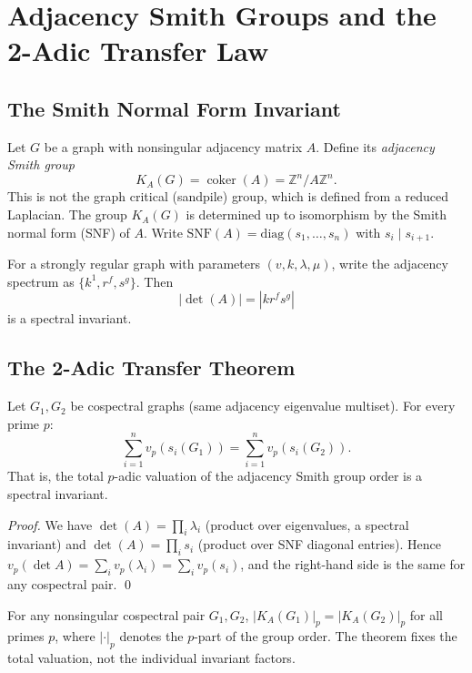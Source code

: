 \section{Adjacency Smith Groups and the 2-Adic Transfer Law}
\label{sec:smith}

\subsection{The Smith Normal Form Invariant}

Let $G$ be a graph with nonsingular adjacency matrix $A$. Define its
\emph{adjacency Smith group}
\[
 K_A(G)=\operatorname{coker}(A)=\mathbb Z^n/A\mathbb Z^n.
\]
This is not the graph critical (sandpile) group, which is defined from a
reduced Laplacian. The group $K_A(G)$ is determined up to isomorphism by the
Smith normal form (SNF) of $A$.
Write $\mathrm{SNF}(A) = \mathrm{diag}(s_1, \ldots, s_n)$ with $s_i \mid s_{i+1}$.

For a strongly regular graph with parameters $(v,k,\lambda,\mu)$, write the
adjacency spectrum as $\{k^1,r^f,s^g\}$. Then
\[
 |\det(A)|=|k r^f s^g|
\]
is a spectral invariant.

\subsection{The 2-Adic Transfer Theorem}

\begin{theorem}
\label{thm:transfer}
Let $G_1, G_2$ be cospectral graphs (same adjacency eigenvalue multiset).
For every prime $p$:
$$\sum_{i=1}^{n} v_p(s_i(G_1)) = \sum_{i=1}^{n} v_p(s_i(G_2)).$$
That is, the total $p$-adic valuation of the adjacency Smith group order is
a spectral invariant.
\end{theorem}

\begin{proof}
We have $\det(A) = \prod_i \lambda_i$ (product over eigenvalues, a spectral invariant)
and $\det(A) = \prod_i s_i$ (product over SNF diagonal entries).
Hence $v_p(\det A) = \sum_i v_p(\lambda_i) = \sum_i v_p(s_i)$,
and the right-hand side is the same for any cospectral pair. \qed
\end{proof}

\begin{corollary}
For any nonsingular cospectral pair $G_1,G_2$,
$|K_A(G_1)|_p=|K_A(G_2)|_p$ for all primes $p$, where $|\cdot|_p$
denotes the $p$-part of the group order. The theorem fixes the total
valuation, not the individual invariant factors.
\end{corollary}

